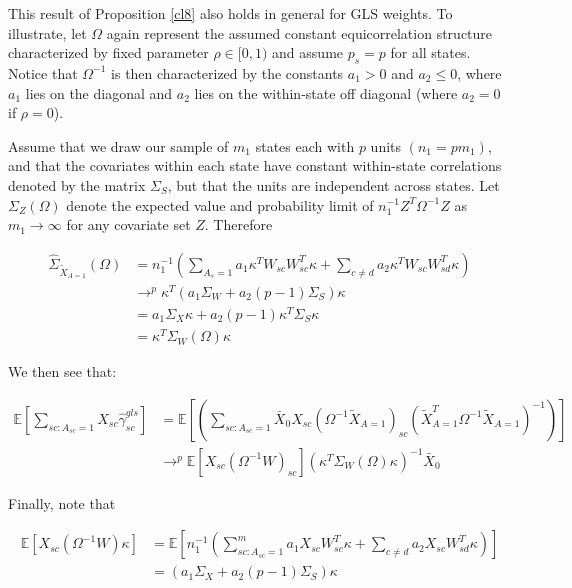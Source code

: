 \begin{remark}
    This result of Proposition \ref{cl8} also holds in general for GLS weights. To illustrate, let $\Omega$ again represent the assumed constant equicorrelation structure characterized by fixed parameter $\rho \in [0, 1)$ and assume $p_s = p$ for all states. Notice that $\Omega^{-1}$ is then characterized by the constants $a_1 > 0$ and $a_2 \le 0$, where $a_1$ lies on the diagonal and $a_2$ lies on the within-state off diagonal (where $a_2 = 0$ if $\rho = 0$).
    
    Assume that we draw our sample of $m_1$ states each with $p$ units $(n_1 = pm_1)$, and that the covariates within each state have constant within-state correlations denoted by the matrix $\Sigma_S$, but that the units are independent across states. Let $\Sigma_Z(\Omega)$ denote the expected value and probability limit of $n_1^{-1}Z^T\Omega^{-1}Z$ as $m_1 \to \infty$ for any covariate set $Z$. Therefore
    
    \begin{align*}
    \hat{\Sigma}_{\tilde{X}_{A=1}}(\Omega) &= n_1^{-1}(\sum_{A_s=1} a_1\kappa^TW_{sc}W_{sc}^T\kappa + \sum_{c\ne d}a_2\kappa^TW_{sc}W_{sd}^T\kappa) \\
    &\to^p \kappa^T(a_1\Sigma_W + a_2(p-1)\Sigma_S)\kappa \\
    &= a_1\Sigma_X\kappa + a_2(p-1)\kappa^T\Sigma_S\kappa \\
    &= \kappa^T\Sigma_W(\Omega)\kappa
    \end{align*}

    We then see that:
    
    \begin{align*}
        \mathbb{E}[\sum_{sc: A_{sc} = 1}X_{sc}\hat{\gamma}^{gls}_{sc}] &= \mathbb{E}[(\sum_{sc: A_{sc} = 1}\bar{X}_0 X_{sc}(\Omega^{-1}\tilde{X}_{A=1})_{sc}(\tilde{X}^T_{A=1}\Omega^{-1}\tilde{X}_{A=1})^{-1})] \\
        &\to^p \mathbb{E}[X_{sc}(\Omega^{-1}W)_{sc}](\kappa^T\Sigma_W(\Omega)\kappa)^{-1}\bar{X}_0
    \end{align*}
    
    Finally, note that
    
    \begin{align*}
        \mathbb{E}[X_{sc}(\Omega^{-1}W)\kappa] &= \mathbb{E}[n_1^{-1}(\sum_{sc: A_{sc} =1}^ma_1X_{sc}W_{sc}^T\kappa + \sum_{c\ne d}a_2X_{sc}W_{sd}^T\kappa)] \\
        &= (a_1\Sigma_X + a_2(p-1)\Sigma_S)\kappa
    \end{align*}
    

\end{remark}
